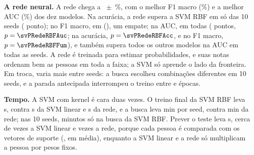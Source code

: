 \textbf{A rede neural.} A rede chega a \svRedeAcc~$\pm$~\svRedeSd\%, com o melhor F1 macro (\svRedeFum\%) e a melhor AUC (\svRedeAuc\%) dos dez modelos. Na acurácia, a rede supera a SVM RBF em só \svSeedsRedeRBFAcc{} das 10 seeds (\svDifRedeRBFAcc{} ponto); no F1 macro, em \svSeedsRedeRBFFum{} (\svDifRedeRBFFum), um empate; na AUC, em todas (\svDifRedeRBFAuc{} pontos, $p = \svPRedeRBFAuc$; na acurácia, $p = \svPRedeRBFAcc$, e no F1 macro, $p = \svPRedeRBFFum$), e também supera todos os outros modelos na AUC em todas as seeds. A rede é treinada para estimar probabilidades, e suas notas ordenam bem as pessoas em toda a faixa; a SVM só aprende o lado da fronteira. Em troca, varia mais entre seeds: a busca escolheu \svRedeComb{} combinações diferentes em 10 seeds, e a parada antecipada interrompeu o treino entre \svRedeEpMin{} e \svRedeEpMax{} épocas.

\textbf{Tempo.} A SVM com kernel é cara duas vezes. O treino final da SVM RBF leva \svRBFTreino{} s, contra \svLinTreino{} s da SVM linear e \svRedeTreino{} s da rede, e a busca leva \svRBFBusca{} min por seed, contra \svRedeBusca{} min da rede; nas 10 seeds, \svBuscaTotalRBF{} minutos só na busca da SVM RBF. Prever o teste leva \svRBFPrevS{} s, cerca de \svRazaoPrevRBFLin{} vezes a SVM linear e \svRazaoPrevRBFRede{} vezes a rede, porque cada pessoa é comparada com os vetores de suporte (\svRBFVet{}, em média), enquanto a SVM linear e a rede só multiplicam a pessoa por pesos fixos.
